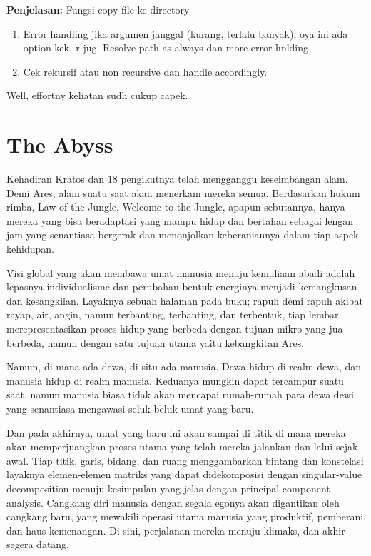\textbf{Penjelasan:} Fungsi copy file ke directory

\begin{enumerate}
    \item Error handling jika argumen janggal (kurang, terlalu banyak), oya ini ada option kek -r jug. Resolve path as always dan more error hnlding
    \item Cek rekursif atau non recursive dan handle accordingly.
\end{enumerate}

Well, effortny keliatan sudh cukup capek.

\section{The Abyss}

Kehadiran Kratos dan 18 pengikutnya telah mengganggu keseimbangan alam. Demi Ares, alam suatu saat akan menerkam mereka semua. Berdasarkan hukum rimba, Law of the Jungle, Welcome to the Jungle, apapun sebutannya, hanya mereka yang bisa beradaptasi yang mampu hidup dan bertahan sebagai lengan jam yang senantiasa bergerak dan menonjolkan keberaniannya dalam tiap aspek kehidupan.

Visi global yang akan membawa umat manusia menuju kemuliaan abadi adalah lepasnya individualisme dan perubahan bentuk energinya menjadi kemangkusan dan kesangkilan. Layaknya sebuah halaman pada buku; rapuh demi rapuh akibat rayap, air, angin, namun terbanting, terbanting, dan terbentuk, tiap lembar merepresentasikan proses hidup yang berbeda dengan tujuan mikro yang jua berbeda, namun dengan satu tujuan utama yaitu kebangkitan Ares.

Namun, di mana ada dewa, di situ ada manusia. Dewa hidup di realm dewa, dan manusia hidup di realm manusia. Keduanya mungkin dapat tercampur suatu saat, namun manusia biasa tidak akan mencapai rumah-rumah para dewa dewi yang senantiasa mengawasi seluk beluk umat yang baru.

Dan pada akhirnya, umat yang baru ini akan sampai di titik di mana mereka akan memperjuangkan proses utama yang telah mereka jalankan dan lalui sejak awal. Tiap titik, garis, bidang, dan ruang menggambarkan bintang dan konstelasi layaknya elemen-elemen matriks yang dapat didekomposisi dengan singular-value decomposition menuju kesimpulan yang jelas dengan principal component analysis. Cangkang diri manusia dengan segala egonya akan digantikan oleh cangkang baru, yang mewakili operasi utama manusia yang produktif, pemberani, dan haus kemenangan. Di sini, perjalanan mereka menuju klimaks, dan akhir segera datang.